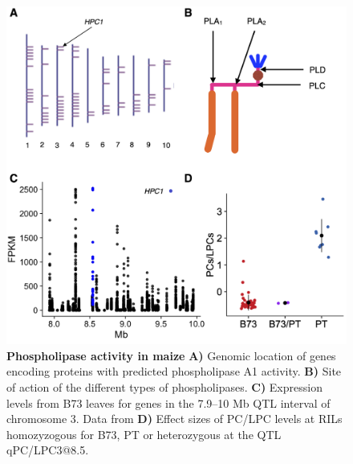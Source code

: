 \documentclass[9pt,twocolumn,twoside,lineno]{biorxiv}
\begin{document}
\clearpage

\begin{figure}[t]
\begin{center}
\includegraphics[width=0.6\paperwidth]{Sup_Figures/Sup_Fig_3.png}
\caption{\textbf{Phospholipase activity in maize} \textbf{A)} Genomic location of genes encoding proteins with predicted phospholipase A1 activity. 
\textbf{B)} Site of action of the different types of phospholipases.
\textbf{C)} Expression levels from B73 leaves for genes in the 7.9--10 Mb QTL interval of chromosome 3. Data from \cite{Stelpflug2016-vr}
\textbf{D)} Effect sizes of PC/LPC levels at RILs homozyzogous for B73, PT or heterozygous at the QTL qPC/LPC3@8.5.
}
\label{figure::Sup:HPC1_misc}
\end{center}
\end{figure} 

\clearpage
\end{document}
